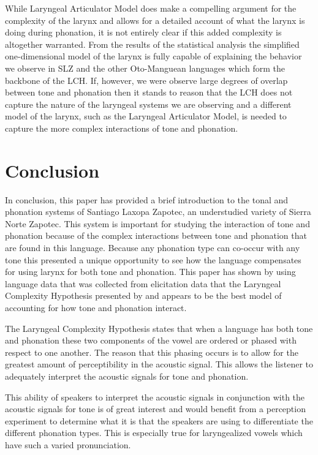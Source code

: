 \documentclass[12pt, letterpaper]{article}
\begin{document}
While  Laryngeal Articulator Model does make a compelling argument for the complexity of the larynx and allows for a detailed account of what the larynx is doing during phonation, it is not entirely clear if this added complexity is altogether warranted. From the results of the statistical analysis the simplified one-dimensional model of the larynx is fully capable of explaining the behavior we observe in SLZ and the other Oto-Manguean languages which form the backbone of the LCH. If, however, we were observe large degrees of overlap between tone and phonation then it stands to reason that the LCH does not capture the nature of the laryngeal systems we are observing and a different model of the larynx, such as the Laryngeal Articulator Model, is needed to capture the more complex interactions of tone and phonation. 

\section{Conclusion} \label{sec:Conclusion}

In conclusion, this paper has provided a brief introduction to the tonal and phonation systems of Santiago Laxopa Zapotec, an understudied variety of Sierra Norte Zapotec. This system is important for studying the interaction of tone and phonation because of the complex interactions between tone and phonation that are found in this language. Because any phonation type can co-occur with any tone this presented a unique opportunity to see how the language compensates for using larynx for both tone and phonation. This paper has shown by using language data that was collected from elicitation data that the Laryngeal Complexity Hypothesis presented by \citet{silvermanLaryngealComplexityOtomanguean1997} and \citet{blankenshipTimeCourseBreathiness1997, blankenshipTimingNonmodalPhonation2002} appears to be the best model of accounting for how tone and phonation interact. 

The Laryngeal Complexity Hypothesis states that when a language has both tone and phonation these two components of the vowel are ordered or phased with respect to one another. The reason that this phasing occurs is to allow for the greatest amount of perceptibility in the acoustic signal. This allows the listener to adequately interpret the acoustic signals for tone and phonation. 

This ability of speakers to interpret the acoustic signals in conjunction with the acoustic signals for tone is of great interest and would benefit from a perception experiment to determine what it is that the speakers are using to differentiate the different phonation types. This is especially true for laryngealized vowels which have such a varied pronunciation. 
\end{document}
